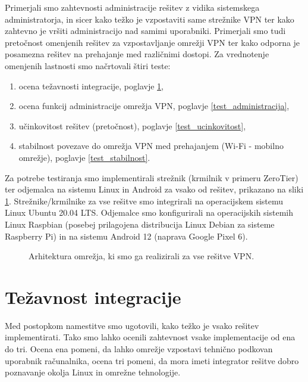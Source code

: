 \documentclass[a4paper, 12pt]{book}
\begin{document}
Primerjali smo zahtevnosti administracije rešitev z vidika sistemskega administratorja, in sicer kako težko je vzpostaviti same strežnike VPN ter kako zahtevno je vršiti administracijo nad samimi uporabniki.
Primerjali smo tudi pretočnost omenjenih rešitev za vzpostavljanje omrežji VPN ter kako odporna je posamezna rešitev na prehajanje med različnimi dostopi.
Za vrednotenje omenjenih lastnosti smo načrtovali štiri teste:
\begin{enumerate}
    \item ocena težavnosti integracije, poglavje \ref{test_integracija},
    \item ocena funkcij administracije omrežja VPN, poglavje \ref{test_administracija},
    \item učinkovitost rešitev (pretočnost), poglavje \ref{test_ucinkovitost},
    \item stabilnost povezave do omrežja VPN med prehajanjem (Wi-Fi - mobilno omrežje), poglavje \ref{test_stabilnost}.
\end{enumerate}

Za potrebe testiranja smo implementirali strežnik (krmilnik v primeru ZeroTier) ter odjemalca na sistemu Linux in Android za vsako od rešitev, prikazano na sliki \ref{implementacija}. Strežnike/krmilnike za vse rešitve smo integrirali na operacijskem sistemu Linux Ubuntu 20.04 LTS. Odjemalce smo konfigurirali na operacijskih sistemih Linux Raspbian (posebej prilagojena distribucija Linux Debian za sisteme Raspberry Pi) in na sistemu Android 12 (naprava Google Pixel 6).

\begin{figure}[h]
\begin{center}

\end{center}
\caption{Arhitektura omrežja, ki smo ga realizirali za vse rešitve VPN. \cite{rvidmar}}
\label{implementacija}
\end{figure}

\section{Težavnost integracije}
\label{test_integracija}
Med postopkom namestitve smo ugotovili, kako težko je vsako rešitev implementirati. Tako smo lahko ocenili zahtevnost vsake implementacije od ena do tri. Ocena ena pomeni, da lahko omrežje vzpostavi tehnično podkovan uporabnik računalnika, ocena tri pomeni, da mora imeti integrator rešitve dobro poznavanje okolja Linux in omrežne tehnologije.
\end{document}
